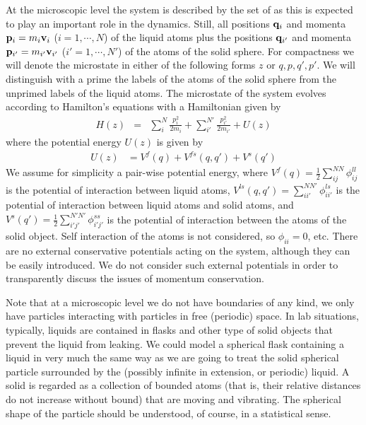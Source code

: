 \documentclass[a4paper,openright,12pt]{book}
\begin{document}
At the microscopic level the system is described  by the set of
as this is expected to play an important role in the dynamics. Still, all  positions  ${\bf  q}_i$  and  momenta  ${\bf  p}_i=m_i{\bf  v}_i$
($i=1,\cdots,N$) of the liquid atoms plus the positions ${\bf q}_{i'}$
and  momenta ${\bf  p}_{i'}=m_{i'}{\bf v}_{i'}$  ($i'=1,\cdots,N'$) of
the atoms  of the solid  sphere.  For  compactness we will  denote the
microstate in either  of the following forms $z$  or ${q,p,q',p'}$. We
will distinguish  with a prime  the labels of  the atoms of  the solid
sphere from the  unprimed labels of the liquid  atoms.  The microstate
of  the  system  evolves  according to  Hamilton's  equations  with  a
Hamiltonian given by
\begin{eqnarray}
H(z) &=& \sum^N_i \frac{p_i^2}{2m_i} + \sum^{N'}_{i'} \frac{p_{i'}^2}{2m_{i'}}
+ U(z)
\label{H}
\end{eqnarray}
where the potential energy $U(z)$ is given by
\begin{align}
U(z)&=  V^{f}(q)+ V^{fs}(q,q')+ V^{s}(q')
\end{align}
We  assume   for  simplicity  a  pair-wise   potential  energy,  where
$V^{f}(q)=\frac{1}{2}\sum^{{NN}}_{i   j}\phi^{ll}_{ij}$   is   the
potential  of  interaction  between   liquid  atoms,  $  V^{ls}(q,q')=
\sum^{NN'}_{ii'}\phi^{ls}_{ii'}$  is  the   potential  of  interaction
between   liquid   atoms   and   solid   atoms,   and   $   V^{s}(q')=
\frac{1}{2}\sum^{{N'N'}}_{i' j'}\phi^{ss}_{i'j'}$ is the potential
of  interaction  between   the  atoms  of  the   solid  object.   Self
interaction of  the atoms  is not  considered, so  $\phi_{ii}=0$, etc.
There are  no external conservative  potentials acting on  the system,
although  they can  be  easily  introduced. We  do  not consider  such
external potentials  in order to  transparently discuss the  issues of
momentum conservation.

Note that at a microscopic level we do not have boundaries of
  any kind, we only have particles interacting with particles in free
(periodic) space.  In lab  situations, typically, liquids are contained
in flasks and other type of  solid objects that prevent the liquid from
leaking.  We could model a spherical  flask containing a liquid in very
much  the same  way  as we  are  going to  treat  the solid  spherical
particle  surrounded  by  the  (possibly  infinite  in  extension,  or
periodic)  liquid. A solid is
  regarded as a collection of  bounded atoms (that is, their relative
distances  do  not  increase  without   bound)  that  are  moving  and
vibrating. The spherical  shape of the particle  should be understood,
of course, in a statistical sense.
\end{document}
